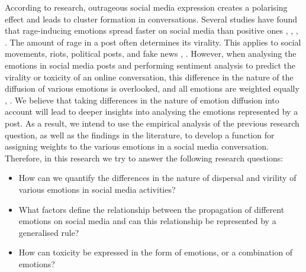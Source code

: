 According to research, outrageous social media expression creates a polarising effect and leads to cluster formation in conversations. Several studies have found that rage-inducing emotions spread faster on social media than positive ones \cite{bacaksizlar2019understanding}, \cite{steinert2022emotions}, \cite{chuai2020anger}, \cite{yi2022depicting}. The amount of rage in a post often determines its virality. This applies to social movements, riots, political posts, and fake news \cite{solovev2022moral}, \cite{mirbabaie2021development}. However, when analysing the emotions in social media posts and performing sentiment analysis to predict the virality or toxicity of an online conversation, this difference in the nature of the diffusion of various emotions is overlooked, and all emotions are weighted equally \cite{yue2019survey}, \cite{nemes2021social}. We believe that taking differences in the nature of emotion diffusion into account will lead to deeper insights into analysing the emotions represented by a post. As a result, we intend to use the empirical analysis of the previous research question, as well as the findings in the literature, to develop a function for assigning weights to the various emotions in a social media conversation. Therefore, in this research we try to answer the following research questions:
\begin{itemize}
    \item How can we quantify the differences in the nature of dispersal and virility of various emotions in social media activities?
    \item What factors define the relationship between the propagation of different emotions on social media and can this relationship be represented by a generalised rule?
    \item How can toxicity be expressed in the form of emotions, or a combination of emotions?
\end{itemize}

